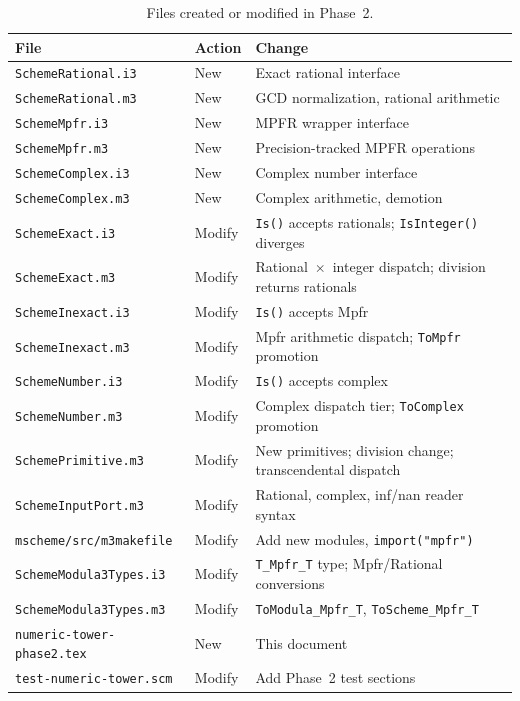 \documentclass[12pt]{article}
\begin{document}
\begin{table}[htbp]
\centering
\small
\begin{tabular}{llp{5.5cm}}
\toprule
\textbf{File} & \textbf{Action} & \textbf{Change} \\
\midrule
{\tt SchemeRational.i3} & New & Exact rational interface \\
{\tt SchemeRational.m3} & New & GCD normalization, rational arithmetic \\
{\tt SchemeMpfr.i3} & New & MPFR wrapper interface \\
{\tt SchemeMpfr.m3} & New & Precision-tracked MPFR operations \\
{\tt SchemeComplex.i3} & New & Complex number interface \\
{\tt SchemeComplex.m3} & New & Complex arithmetic, demotion \\
\midrule
{\tt SchemeExact.i3} & Modify & {\tt Is()} accepts rationals;
  {\tt IsInteger()} diverges \\
{\tt SchemeExact.m3} & Modify & Rational~$\times$~integer dispatch;
  division returns rationals \\
{\tt SchemeInexact.i3} & Modify & {\tt Is()} accepts Mpfr \\
{\tt SchemeInexact.m3} & Modify & Mpfr arithmetic dispatch;
  {\tt ToMpfr} promotion \\
{\tt SchemeNumber.i3} & Modify & {\tt Is()} accepts complex \\
{\tt SchemeNumber.m3} & Modify & Complex dispatch tier;
  {\tt ToComplex} promotion \\
{\tt SchemePrimitive.m3} & Modify & New primitives; division
  change; transcendental dispatch \\
{\tt SchemeInputPort.m3} & Modify & Rational, complex, inf/nan
  reader syntax \\
{\tt mscheme/src/m3makefile} & Modify & Add new modules,
  {\tt import("mpfr")} \\
\midrule
{\tt SchemeModula3Types.i3} & Modify & {\tt T\_Mpfr\_T} type;
  Mpfr/Rational conversions \\
{\tt SchemeModula3Types.m3} & Modify & {\tt ToModula\_Mpfr\_T},
  {\tt ToScheme\_Mpfr\_T} \\
\midrule
{\tt numeric-tower-phase2.tex} & New & This document \\
{\tt test-numeric-tower.scm} & Modify & Add Phase~2 test sections \\
\bottomrule
\end{tabular}
\caption{Files created or modified in Phase~2.}
\label{tab:files}
\end{table}
\end{document}
